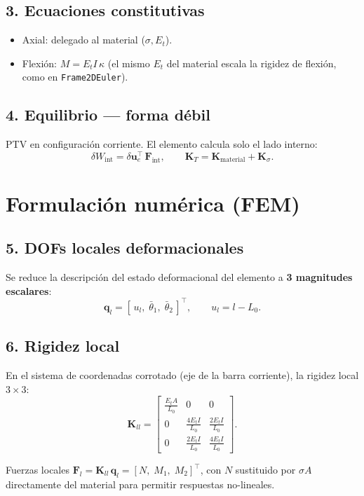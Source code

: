 \documentclass[11pt,letterpaper,oneside]{report}
\begin{document}
\subsection{3. Ecuaciones constitutivas}
\begin{itemize}
  \item Axial: delegado al material ($\sigma, E_t$).
  \item Flexión: $M = E_t I\,\kappa$ (el mismo $E_t$ del material escala la rigidez de flexión, como en \texttt{Frame2DEuler}).
\end{itemize}

\subsection{4. Equilibrio --- forma débil}
PTV en configuración corriente. El elemento calcula solo el lado interno:
\[
\delta W_{\text{int}} = \delta\mathbf u_e^\top\,\mathbf F_{\text{int}}, \qquad \mathbf K_T = \mathbf K_{\text{material}} + \mathbf K_{\sigma}.
\]


\section{Formulación numérica (FEM)}

\subsection{5. DOFs locales deformacionales}
Se reduce la descripción del estado deformacional del elemento a \textbf{3 magnitudes escalares}:
\[
\mathbf q_l = [\,u_l,\; \bar\theta_1,\; \bar\theta_2\,]^\top, \qquad u_l = l - L_0.
\]

\subsection{6. Rigidez local}
En el sistema de coordenadas corrotado (eje de la barra corriente), la rigidez local $3\times 3$:
\[
\mathbf K_{ll} = \begin{bmatrix}
\tfrac{E_t A}{L_0} & 0 & 0 \\
0 & \tfrac{4 E_t I}{L_0} & \tfrac{2 E_t I}{L_0} \\
0 & \tfrac{2 E_t I}{L_0} & \tfrac{4 E_t I}{L_0}
\end{bmatrix}.
\]

Fuerzas locales $\mathbf F_l = \mathbf K_{ll}\,\mathbf q_l = [N,\; M_1,\; M_2]^\top$, con $N$ sustituido por $\sigma A$ directamente del material para permitir respuestas no-lineales.
\end{document}
